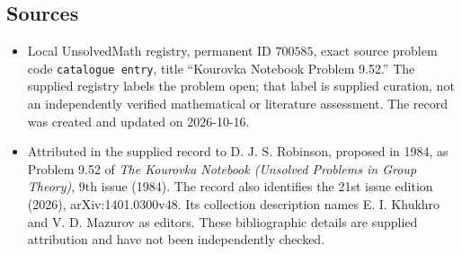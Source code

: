 \documentclass[11pt]{article}
\begin{document}
\subsection{Sources}
\begin{itemize}
\item Local UnsolvedMath registry, permanent ID \(700585\), exact source problem code \texttt{catalogue entry}, title ``Kourovka Notebook Problem 9.52.'' The supplied registry labels the problem open; that label is supplied curation, not an independently verified mathematical or literature assessment. The record was created and updated on 2026-10-16.
\item Attributed in the supplied record to D. J. S. Robinson, proposed in 1984, as Problem 9.52 of \emph{The Kourovka Notebook (Unsolved Problems in Group Theory)}, 9th issue (1984). The record also identifies the 21st issue edition (2026), arXiv:1401.0300v48. Its collection description names E. I. Khukhro and V. D. Mazurov as editors. These bibliographic details are supplied attribution and have not been independently checked.
\end{itemize}
\end{document}
